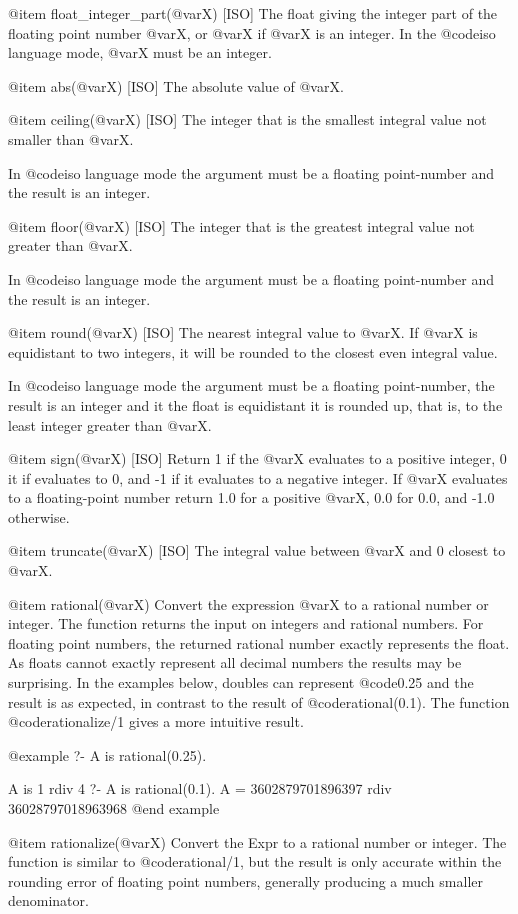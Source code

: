 {{{{@item float_integer_part(@var{X}) [ISO]
The float giving the integer part of the floating point number @var{X},
or @var{X} if @var{X} is an integer. In the @code{iso} language mode,
@var{X} must be an integer.

@item abs(@var{X}) [ISO]
The absolute value of @var{X}.

@item ceiling(@var{X}) [ISO]
The integer that is the smallest integral value not smaller than @var{X}.

In @code{iso} language mode the argument must be a floating
point-number and the result is an integer.

@item floor(@var{X}) [ISO]
The integer that is the greatest integral value not greater than @var{X}.

In @code{iso} language mode the argument must be a floating
point-number and the result is an integer.

@item round(@var{X}) [ISO]
The nearest integral value to @var{X}. If @var{X} is
equidistant to two integers, it will be rounded to the closest even
integral value.

In @code{iso} language mode the argument must be a floating
point-number, the result is an integer and it the float is equidistant
it is rounded up, that is, to the least integer greater than @var{X}.

@item sign(@var{X}) [ISO]
Return 1 if the @var{X} evaluates to a positive integer, 0 it if
evaluates to 0, and -1 if it evaluates to a negative integer. If @var{X}
evaluates to a floating-point number return 1.0 for a positive @var{X},
0.0 for 0.0, and -1.0 otherwise.

@item truncate(@var{X}) [ISO]
The integral value between @var{X} and 0 closest to
@var{X}.

@item rational(@var{X})
Convert the expression @var{X} to a rational number or integer. The
function returns the input on integers and rational numbers. For
floating point numbers, the returned rational number exactly represents
the float. As floats cannot exactly represent all decimal numbers the
results may be surprising. In the examples below, doubles can represent
@code{0.25} and the result is as expected, in contrast to the result of
@code{rational(0.1)}. The function @code{rationalize/1} gives a more
intuitive result.

@example
?- A is rational(0.25).

A is 1 rdiv 4
?- A is rational(0.1).
A = 3602879701896397 rdiv 36028797018963968
@end example

@item rationalize(@var{X})
Convert the Expr to a rational number or integer. The function is
similar to @code{rational/1}, but the result is only accurate within the
rounding error of floating point numbers, generally producing a much
smaller denominator. 

}}}}
